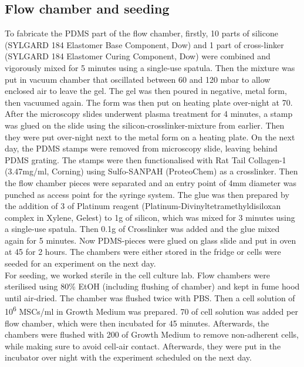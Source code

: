 \subsection{Flow chamber and seeding}
\label{sec:FluidicModel}
To fabricate the PDMS part of the flow chamber, firstly, 10 parts of silicone (SYLGARD\texttrademark{} 184 Elastomer Base Component, Dow) and 1 part of cross-linker (SYLGARD\texttrademark{} 184 Elastomer Curing Component, Dow) were combined and vigorously mixed for 5 minutes using a single-use spatula. Then the mixture was put in vacuum chamber that oscillated between 60 and 120 mbar to allow enclosed air to leave the gel. The gel was then poured in negative, metal form, then vacuumed again. The form was then put on heating plate over-night at 70\degC{}. After the microscopy slides underwent plasma treatment for 4 minutes, a stamp was glued on the slide using the silicon-crosslinker-mixture from earlier. Then they were put over-night next to the metal form on a heating plate. On the next day, the PDMS stamps were removed from microscopy slide, leaving behind PDMS grating. The stamps were then functionalised with Rat Tail Collagen-1 (3.47mg/ml, Corning) using Sulfo-SANPAH (ProteoChem) as a crosslinker. Then the flow chamber pieces were separated and an entry point of 4mm diameter was punched as access point for the syringe system. The glue was then prepared by the addition of 3\mul{} of Platinum reagent (Platinum-Divinyltetramethyldisiloxan complex in Xylene, Gelest) to 1g of silicon, which was mixed for 3 minutes using a single-use spatula. Then 0.1g of Crosslinker was added and the glue mixed again for 5 minutes. Now PDMS-pieces were glued on glass slide and put in oven at 45\degC{} for 2 hours. The chambers were either stored in the fridge or cells were seeded for an experiment on the next day.\\
For seeding, we worked sterile in the cell culture lab. Flow chambers were sterilised using 80\% EtOH (including flushing of chamber) and kept in fume hood until air-dried. The chamber was flushed twice with PBS. Then a cell solution of 10\textsuperscript{6} MSCs/ml in Growth Medium was prepared. 70 \mul{} of cell solution was added per flow chamber, which were then incubated for 45 minutes. Afterwards, the chambers were flushed with 200\mul{} of Growth Medium to remove non-adherent cells, while making sure to avoid cell-air contact. Afterwards, they were put in the incubator over night with the experiment scheduled on the next day.\\

